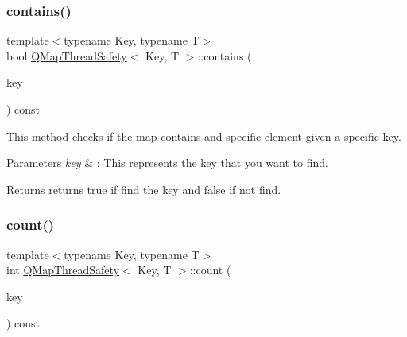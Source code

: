 \mbox{\label{class_q_map_thread_safety_acaafd9933cb391e27a81c26df712786b}} 
\subsubsection{\texorpdfstring{contains()}{contains()}}
{\footnotesize\ttfamily template$<$typename Key, typename T$>$ \\
bool \hyperlink{class_q_map_thread_safety}{Q\+Map\+Thread\+Safety}$<$ Key, T $>$\+::contains (\begin{DoxyParamCaption}\item[{const Key \&}]{key }\end{DoxyParamCaption}) const\hspace{0.3cm}{\ttfamily [inline]}}



This method checks if the map contains and specific element given a specific key. 


\begin{DoxyParams}{Parameters}
{\em key} & \+: This represents the key that you want to find. \\
\hline
\end{DoxyParams}
\begin{DoxyReturn}{Returns}
returns true if find the key and false if not find. 
\end{DoxyReturn}
\mbox{\label{class_q_map_thread_safety_a4542fc3dc112550bf8b0833338bfcaaf}} 
\subsubsection{\texorpdfstring{count()}{count()}\hspace{0.1cm}{\footnotesize\ttfamily [1/2]}}
{\footnotesize\ttfamily template$<$typename Key, typename T$>$ \\
int \hyperlink{class_q_map_thread_safety}{Q\+Map\+Thread\+Safety}$<$ Key, T $>$\+::count (\begin{DoxyParamCaption}\item[{const Key \&}]{key }\end{DoxyParamCaption}) const\hspace{0.3cm}{\ttfamily [inline]}}

